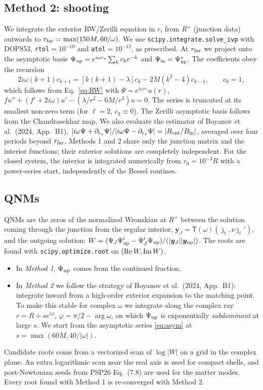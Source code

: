 \documentclass[11pt,a4paper]{article}
\numberwithin{equation}{section}
\newcommand{\jh}{\hat\jmath_\ell}
\begin{document}
\subsection{Method 2: shooting}
We integrate the exterior RW/Zerilli equation in $r$, from $R^+$ (junction data) outwards to
$r_{\rm far}=\max(150M,60/\omega)$. We use \texttt{scipy.integrate.solve\_ivp} with DOP853,
\texttt{rtol}$=10^{-10}$ and \texttt{atol}$=10^{-12}$, as prescribed. At $r_{\rm far}$ we project onto the
asymptotic basis $\Psi_{\rm up}=e^{i\omega r_*}\sum_kc_kr^{-k}$ and $\Psi_{\rm in}=\Psi_{\rm up}^*$. The
coefficients obey the recursion
\begin{equation}
2i\omega(k+1)c_{k+1}=[k(k+1)-\lambda]c_k-2M(k^2-4)c_{k-1},\qquad c_0=1,
\label{eq:asym}
\end{equation}
which follows from Eq.~\eqref{eq:RW} with $\Psi=e^{i\omega r_*}u(r)$, $fu''+(f'+2i\omega)u'-(\lambda/r^2-6M/r^3)u=0$.
The series is truncated at its smallest non-zero term (for $\ell=2$, $c_3\equiv0$). The Zerilli asymptotic
basis follows from the Chandrasekhar map. We also evaluate the estimator of Boyanov et al.\ (2024,
App.~B1), $|i\omega\Psi+\partial_{r_*}\Psi|/|i\omega\Psi-\partial_{r_*}\Psi|=|B_{\rm out}/B_{\rm in}|$,
averaged over four periods beyond $r_{\rm far}$. Methods 1 and 2 share only the junction matrix and the
interior functions; their exterior solutions are completely independent. For the closed system, the
interior is integrated numerically from $r_0=10^{-3}R$ with a power-series start, independently of the
Bessel routines.

\subsection{QNMs}
QNMs are the zeros of the normalized Wronskian at $R^+$ between the solution coming through the junction
from the regular interior, $\bm y_J=\mathsf T(\omega)(\jh,\nu\jh')$, and the outgoing solution:
$W=(\Psi_J\Psi_{\rm up}'-\Psi_J'\Psi_{\rm up})/(|\bm y_J||\bm y_{\rm up}|)$. The roots are found with
\texttt{scipy.optimize.root} on $({\rm Re}\,W,{\rm Im}\,W)$.
\begin{itemize}
\item In \emph{Method 1}, $\Psi_{\rm up}$ comes from the continued fraction.
\item In \emph{Method 2} we follow the strategy of Boyanov et al.\ (2024, App.~B1): integrate inward from a
high-order exterior expansion to the matching point. To make this stable for complex $\omega$ we integrate
along the complex ray $r=R+se^{i\varphi}$, $\varphi=\pi/2-\arg\omega$, on which $\Psi_{\rm up}$ is
exponentially \emph{subdominant} at large $s$. We start from the asymptotic series \eqref{eq:asym} at
$s=\max(60M,40/|\omega|)$.
\end{itemize}
Candidate roots come from a vectorized scan of $\log|W|$ on a grid in the complex plane. An extra
logarithmic scan near the real axis is used for compact shells, and post-Newtonian seeds from PSP26
Eq.~(7.8) are used for the matter modes. Every root found with Method 1 is re-converged with Method 2.
\end{document}
